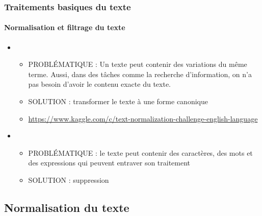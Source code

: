\documentclass[xcolor=table]{beamer}
\begin{document}
\begin{frame}
\frametitle{Traitements basiques du texte}
\framesubtitle{Normalisation et filtrage du texte}

\begin{itemize}
	\item {}
	\begin{itemize}
		\item PROBLÉMATIQUE : Un texte peut contenir des variations du même terme. Aussi, dans des tâches comme la recherche d'information, on n'a pas besoin d'avoir le contenu exacte du texte.
		\item SOLUTION : transformer le texte à une forme canonique 
		\item \url{https://www.kaggle.com/c/text-normalization-challenge-english-language}
	\end{itemize}
	\item {}
	\begin{itemize}
		\item PROBLÉMATIQUE : le texte peut contenir des caractères, des mots et des expressions qui peuvent entraver son traitement
		\item SOLUTION : suppression
	\end{itemize}
\end{itemize}

\end{frame}

\subsection{Normalisation du texte}
\end{document}
